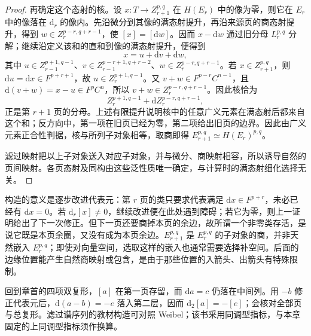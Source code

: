 \begin{proof}
	再确定这个态射的核。设 \(x:T\to Z_{r+1}^{p,q}\) 在 \(H(E_r)\) 中的像为零，则它在 \(E_r\) 中的像落在 \(\mathrm d_r\) 的像内。先沿微分到其像的满态射提升，再沿来源页的商态射提升，得到 \(w\in Z_r^{p-r,q+r-1}\)，使 \([x]=[\mathrm d w]\)。因而 \(x-\mathrm d w\) 通过旧分母 \(L_r^{p,q}\) 分解；继续沿定义该和的直和到像的满态射提升，便得到
	\[
		x=u+\mathrm{d}v+\mathrm{d}w,
	\]
	其中 \(u\in Z_{r-1}^{p+1,q-1}\)、\(v\in Z_{r-1}^{p-r+1,q+r-2}\)、\(w\in Z_r^{p-r,q+r-1}\)。若 \(x\in Z_{r+1}^{p,q}\)，则 \(\mathrm{d}u=\mathrm{d}x\in F^{p+r+1}\)，故 \(u\in Z_r^{p+1,q-1}\)。又 \(v+w\in F^{p-r}C^{n-1}\)，且 \(\mathrm{d}(v+w)=x-u\in F^pC^n\)，所以 \(v+w\in Z_r^{p-r,q+r-1}\)。因此核恰为
	\[
		Z_r^{p+1,q-1}+\mathrm{d}Z_r^{p-r,q+r-1},
	\]
	正是第 \(r+1\) 页的分母。上述有限提升说明核中的任意广义元素在满态射后都来自这个和；反方向中，第一项在旧页已经为零，第二项给出旧页的边界。因此由广义元素正合性判据，核与所列子对象相等，取商即得 \(E_{r+1}^{p,q}\simeq H(E_r)^{p,q}\)。

	滤过映射把以上子对象送入对应子对象，并与微分、商映射相容，所以诱导自然的页间映射。各页态射及同构由这些泛性质唯一确定，与计算时的满态射细化选择无关。
\end{proof}

构造的意义是逐步改进代表元：第 \(r\) 页的类只要求代表满足 \(\mathrm{d}x\in F^{p+r}\)，未必已经有 \(\mathrm{d}x=0\)。若 \(\mathrm{d}_r[x]\ne0\)，继续改进便在此处遇到障碍；若它为零，则上一证明给出了下一次修正。但下一页还要商掉本页的余边，故所谓一个非零类存活，是说它既是本页余圈，又没有成为本页余边。\(E_{r+1}^{p,q}\) 是 \(E_r^{p,q}\) 的子对象的商，并非天然嵌入 \(E_r^{p,q}\)；即使对向量空间，选取这样的嵌入也通常需要选择补空间。后面的边缘位置能产生自然商映射或包含，是由于那些位置的入箭头、出箭头有特殊限制。

\ProseParagraphBreak
回到章首的四项双复形，\([a]\) 在第一页存留，而 \(\mathrm{d}a=c\) 仍落在中间列。用 \(-b\) 修正代表元后，\(\mathrm{d}(a-b)=-e\) 落入第二层，因而 \(\mathrm{d}_2[a]=-[e]\)；会核对全部页与总复形。滤过谱序列的教材构造可对照 Weibel\cite[Section 5.4, Construction Theorem 5.4.1, Construction 5.4.6 and Lemma 5.4.7]{Weibel1994HomologicalAlgebra}；该书采用同调型指标，与本章固定的上同调型指标须作换算。

